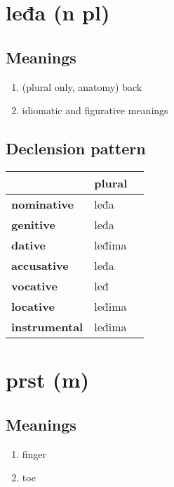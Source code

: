 \filbreak
\section{leđa (n pl)}
\subsection*{Meanings}
\begin{enumerate}
\item (plural only, anatomy) back
\item idiomatic and figurative meanings
\end{enumerate}
\subsection*{Declension pattern}
\begin{tabularx}{\linewidth}{Xll}
\toprule
{} &  plural \\
\midrule
\textbf{nominative  } &    leđa \\
\textbf{genitive    } &    leđa \\
\textbf{dative      } &  leđima \\
\textbf{accusative  } &    leđa \\
\textbf{vocative    } &     leđ \\
\textbf{locative    } &  leđima \\
\textbf{instrumental} &  leđima \\
\bottomrule
\end{tabularx}

\filbreak
\section{prst (m)}
\subsection*{Meanings}
\begin{enumerate}
\item finger
\item toe
\end{enumerate}
